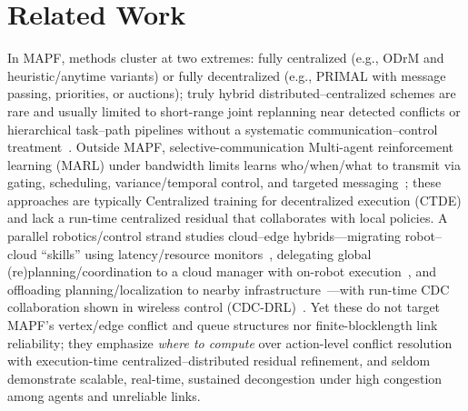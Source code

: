 \documentclass[conference]{IEEEtran}
\begin{document}
\section{Related Work}
In MAPF, methods cluster at two extremes: fully centralized (e.g., ODrM and heuristic/anytime variants) or fully decentralized (e.g., PRIMAL with message passing, priorities, or auctions); truly hybrid distributed--centralized schemes are rare and usually limited to short-range joint replanning near detected conflicts or hierarchical task--path pipelines without a systematic communication--control treatment~\cite{ferner2013odrm,huang2022anytime,sartoretti2019primal,li2021lifelong,skrynnik2024learn,ma2021distributed,li2022multi}.
Outside MAPF, selective-communication Multi-agent reinforcement learning (MARL) under bandwidth limits learns who/when/what to transmit via gating, scheduling, variance/temporal control, and targeted messaging~\cite{singh2018learning,kim2019learning,zhang2019efficient,zhang2020succinct,wang2019learning,ding2020learning}; these approaches are typically Centralized training for decentralized execution (CTDE) and lack a run-time centralized residual that collaborates with local policies.
A parallel robotics/control strand studies cloud--edge hybrids—migrating robot--cloud ``skills'' using latency/resource monitors~\cite{muratore2023xbot2d}, delegating global (re)planning/coordination to a cloud manager with on-robot execution~\cite{zagradjanin2019cloud}, and offloading planning/localization to nearby infrastructure~\cite{spatharakis2020switching}—with run-time CDC collaboration shown in wireless control (CDC-DRL)~\cite{wang2024wireless}. Yet these do not target MAPF's vertex/edge conflict and queue structures nor finite-blocklength link reliability; they emphasize \emph{where to compute} over action-level conflict resolution with execution-time centralized--distributed residual refinement, and seldom demonstrate scalable, real-time, sustained decongestion under high congestion among agents and unreliable links.


 

\end{document}
